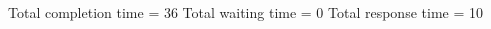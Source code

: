 \begin{RTGrid}[width=0.8\textwidth]{5}{20}
\end{RTGrid}\newline\newline
Total completion time = 36\newline
Total waiting time = 0\newline
Total response time = 10\newline
